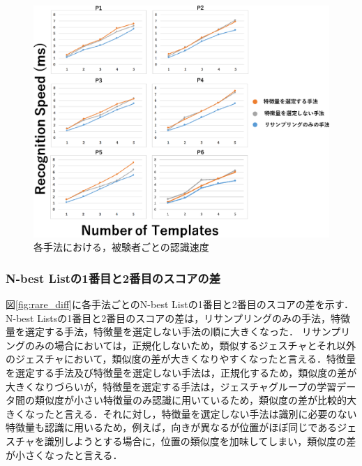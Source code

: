 \begin{figure}[!h]
\centering
\includegraphics[width=1.0\columnwidth]{img/pre_speed.eps}
\caption{各手法における，被験者ごとの認識速度}
\label{fig:rare_speed}
\end{figure}

\subsubsection{N-best Listの1番目と2番目のスコアの差}
図\ref{fig:rare_diff}に各手法ごとのN-best Listの1番目と2番目のスコアの差を示す．
N-best Listsの1番目と2番目のスコアの差は，リサンプリングのみの手法，特徴量を選定する手法，特徴量を選定しない手法の順に大きくなった．
リサンプリングのみの場合においては，正規化しないため，類似するジェスチャとそれ以外のジェスチャにおいて，類似度の差が大きくなりやすくなったと言える．特徴量を選定する手法及び特徴量を選定しない手法は，正規化するため，類似度の差が大きくなりづらいが，特徴量を選定する手法は，ジェスチャグループの学習データ間の類似度が小さい特徴量のみ認識に用いているため，類似度の差が比較的大きくなったと言える．それに対し，特徴量を選定しない手法は識別に必要のない特徴量も認識に用いるため，例えば，向きが異なるが位置がほぼ同じであるジェスチャを識別しようとする場合に，位置の類似度を加味してしまい，類似度の差が小さくなったと言える．


